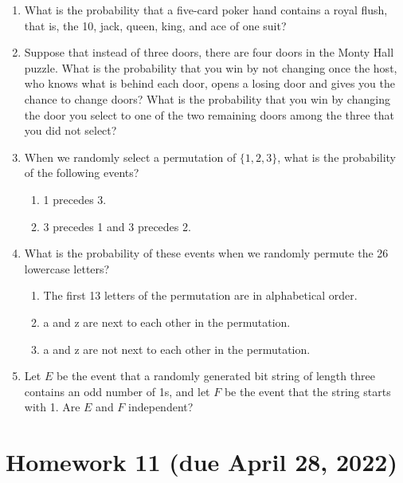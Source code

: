 \documentclass[letterpaper, 12pt]{article}
\begin{document}
\begin{enumerate}
    \item What is the probability that a five-card poker hand contains a royal flush, that is, the 10, jack, queen, king, and ace of one suit?
    \item Suppose that instead of three doors, there are four doors in the Monty Hall puzzle. What is the probability that you win by not changing once the host, who knows what is behind each door, opens a losing door and gives you the chance to change doors? What is the probability that you win by changing the door you select to one of the two remaining doors among the three that you did not select?
    \item When we randomly select a permutation of $\{ 1, 2, 3 \}$, what is the probability of the following events?
    \begin{enumerate}
        \item 1 precedes 3.
        \item 3 precedes 1 and 3 precedes 2.
    \end{enumerate}
    \item What is the probability of these events when we randomly permute the 26 lowercase letters?
    \begin{enumerate}
        \item The first 13 letters of the permutation are in alphabetical order.
        \item a and z are next to each other in the permutation.
        \item a and z are not next to each other in the permutation.
    \end{enumerate}
    \item Let $E$ be the event that a randomly generated bit string of length three contains an odd number of 1s, and let $F$ be the event that the string starts with 1. Are $E$ and $F$ independent?
\end{enumerate}

\section*{Homework 11 (due April 28, 2022)}
\end{document}
